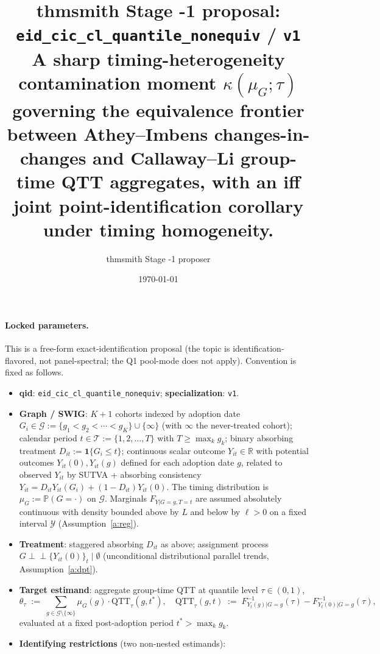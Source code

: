\documentclass[11pt]{article}
\title{thmsmith Stage -1 proposal: \texttt{eid\_cic\_cl\_quantile\_nonequiv} / \texttt{v1}%
  \\ \large A sharp timing-heterogeneity contamination moment $\kappa(\mu_G;\tau)$ governing the equivalence frontier between Athey--Imbens changes-in-changes and Callaway--Li group-time QTT aggregates, with an iff joint point-identification corollary under timing homogeneity.}
\author{thmsmith Stage -1 proposer}
\date{\today}
\renewcommand{\Pr}{\mathbb{P}}
\newcommand{\one}{\mathbf{1}}
\newcommand{\R}{\mathbb{R}}
\theoremstyle{definition}
\theoremstyle{plain}
\theoremstyle{remark}
\begin{document}
\maketitle


\paragraph{Locked parameters.}
This is a free-form exact-identification proposal (the topic is identification-flavored, not panel-spectral; the Q1 pool-mode does not apply). Convention is fixed as follows.
\begin{itemize}[leftmargin=*,itemsep=2pt,topsep=2pt]
  \item \textbf{qid}: \texttt{eid\_cic\_cl\_quantile\_nonequiv}; \textbf{specialization}: \texttt{v1}.
  \item \textbf{Graph / SWIG}: $K+1$ cohorts indexed by adoption date $G_i \in \mathcal{G} := \{g_1 < g_2 < \cdots < g_K\} \cup \{\infty\}$ (with $\infty$ the never-treated cohort); calendar period $t \in \mathcal{T} := \{1, 2, \ldots, T\}$ with $T \ge \max_k g_k$; binary absorbing treatment $D_{it} := \one\{G_i \le t\}$; continuous scalar outcome $Y_{it} \in \R$ with potential outcomes $Y_{it}(0), Y_{it}(g)$ defined for each adoption date $g$, related to observed $Y_{it}$ by SUTVA + absorbing consistency $Y_{it} = D_{it} Y_{it}(G_i) + (1 - D_{it}) Y_{it}(0)$. The timing distribution is $\mu_G := \Pr(G = \cdot)$ on $\mathcal{G}$. Marginals $F_{Y|G=g, T=t}$ are assumed absolutely continuous with density bounded above by $L$ and below by $\ell > 0$ on a fixed interval $\mathcal{Y}$ (Assumption~\ref{a:reg}).
  \item \textbf{Treatment}: staggered absorbing $D_{it}$ as above; assignment process $G \perp\!\!\!\perp \{Y_{it}(0)\}_t \mid \emptyset$ (unconditional distributional parallel trends, Assumption~\ref{a:dpt}).
  \item \textbf{Target estimand}: aggregate group-time QTT at quantile level $\tau \in (0,1)$,
    \[
      \theta_\tau \;:=\; \sum_{g \in \mathcal{G} \setminus \{\infty\}} \mu_G(g) \cdot \mathrm{QTT}_\tau(g, t^*) ,
      \quad
      \mathrm{QTT}_\tau(g, t) \;:=\; F^{-1}_{Y_t(g) | G = g}(\tau) - F^{-1}_{Y_t(0) | G = g}(\tau),
    \]
    evaluated at a fixed post-adoption period $t^* > \max_k g_k$.
  \item \textbf{Identifying restrictions} (two non-nested estimands):
    \begin{itemize}[leftmargin=*,itemsep=1pt,topsep=1pt]

\end{itemize}
\end{itemize}
\end{document}
